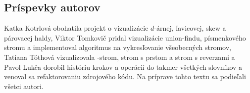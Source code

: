 \subsection{Príspevky autorov}
Katka Kotrlová obohatila projekt o vizualizácie $d$-árnej, ľavicovej, skew a 
párovacej haldy, Viktor Tomkovič pridal vizualizácie union-findu, písmenkového 
stromu a implementoval algoritmus na vykresľovanie všeobecných stromov, 
Tatiana Tóthová vizualizovala \Bp-strom, strom s prstom a strom s reverzami 
a Pavol Lukča dorobil históriu krokov a operácií do takmer všetkých slovníkov 
a venoval sa refaktorovaniu zdrojového kódu. Na príprave tohto textu sa 
podieľali všetci autori.

